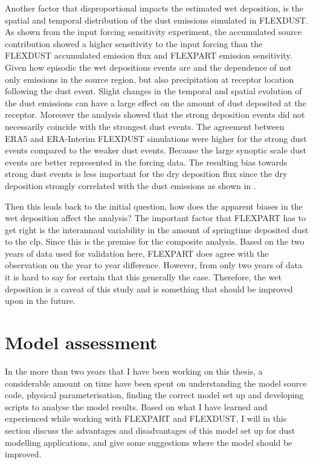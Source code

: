 Another factor that disproportional impacts the estimated wet deposition, is the spatial and temporal distribution of the dust emissions simulated in FLEXDUST. 
As shown from the input forcing sensitivity experiment, the accumulated source contribution showed a higher sensitivity to the input forcing than the FLEXDUST accumulated emission flux and FLEXPART emission sensitivity. Given how episodic the wet depositions events are and the dependence of not only emissions in the source region, but also precipitation at receptor location following the dust event. Slight changes in the temporal and spatial evolution of the dust emissions can have a large effect on the amount of dust deposited at the receptor. Moreover the analysis showed that the strong deposition events did not necessarily coincide with the strongest dust events. The agreement between ERA5 and ERA-Interim FLEXDUST simulations were higher for the strong dust events compared to the weaker dust events. Because the large synoptic scale dust events are better represented in the forcing data. The resulting bias towards strong dust events is less important for the dry deposition flux since the dry deposition strongly correlated with the dust emissions as shown in . 


Then this leads back to the initial question, how does the apparent biases in the wet deposition affect the analysis? 
The important factor that FLEXPART has to get right is the interannaul variability in the amount of springtime deposited dust to the \acrshort{clp}. 
Since this is the premise for the composite analysis. 
Based on the two years of data used for validation here, FLEXPART does agree with the observation on the year to year difference. 
However, from only two years of data it is hard to say for certain that this generally the case. 
Therefore, the wet deposition is a caveat of this study and is something that should be improved upon in the future. 

\section{Model assessment}
In the more than two years that I have been working on this thesis, a considerable amount on time have been spent on understanding the model source code, physical parameterisation, finding the correct model set up and developing scripts to analyse the model results. 
Based on what I have learned and experienced while working with FLEXPART and FLEXDUST, I will in this section discuss the  
advantages and disadvantages of this model set up for dust modelling applications, and give some suggestions where the model should be improved.
